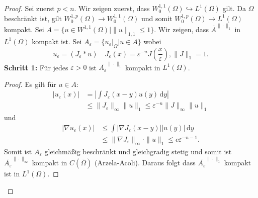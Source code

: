 \documentclass[
paper=a4,
bibtotocnumbered,
liststotocnumbered,
tablecaptionabove,
pointlessnumbers,
twoside,
openright,
10pt
]
{report}
\theoremstyle{definition}
\numberwithin{equation}{chapter}
\begin{document}
\begin{proof}
Sei zuerst $p<n$. Wir zeigen zuerst, dass $W_0^{1,1}(\Omega) \hookrightarrow L^1(\Omega)$ gilt. Da $\Omega$ beschränkt ist, gilt $W_0^{1,p}(\Omega) \to W_0^{1,1}(\Omega)$ und somit $W_0^{1,p}(\Omega) \to L^1(\Omega)$ kompakt. Sei $A=\{u\in W^{1,1}(\Omega) |\|u\|_{1,1} \le 1\}$. Wir zeigen, dass $\overline{A}^{\|\cdot\|_1}$ in $L^1(\Omega)$ kompakt ist. Sei $A_\varepsilon = \{u_\varepsilon\big |_\Omega |u\in A\}$ wobei
\begin{equation}
 u_\varepsilon = (J_\varepsilon * u) \quad J_\varepsilon(x) = \varepsilon^{-n} J( \frac{x}{\varepsilon}), \|J\|_1=1. 
\end{equation}
\textbf{Schritt 1:} Für jedes $\varepsilon >0$ ist $\overline{A_{\varepsilon}}^{\|\cdot\|_1}$ kompakt in $L^1(\Omega)$.
\begin{proof}
Es gilt für $u\in A$:
\begin{align*}
 |u_\varepsilon(x)| &= |\int J_\varepsilon(x-y) u(y) \, \mathrm dy| \\
 &\le \| J_\varepsilon \|_\infty \| u \|_1 \le \varepsilon^{-n} \| J\|_\infty\|u\|_1
\end{align*}
und 
\begin{align*}
 |\nabla u_\varepsilon(x)| &\le \int |\nabla J_\varepsilon(x-y)||u(y)|\, \mathrm dy\\
 &\le \| \nabla J_{\varepsilon}\|_\infty \cdot \|u\|_1 \le c \varepsilon^{-n-1}.
\end{align*}
Somit ist $A_\varepsilon$ gleichmäßig beschränkt und gleichgradig stetig und somit ist
$\overline{A_\varepsilon}^{\|\cdot \|_\infty}$ kompakt in $C(\overline{\Omega})$ (Arzela-Acoli). Daraus folgt dass $\overline{A_\varepsilon}^{\| \cdot \|_1}$ kompakt ist in $L^1(\Omega)$.


\end{proof}
\end{proof}
\end{document}
